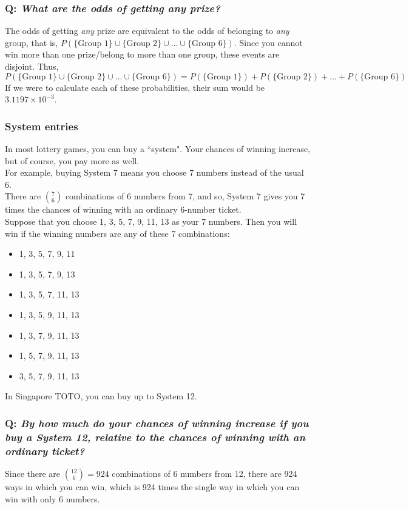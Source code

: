 \documentclass{article}
\begin{document}
\subsubsection*{Q: {\em What are the odds of getting {\em any} prize?}}
The odds of getting \textit{any} prize are equivalent to the odds of belonging to \textit{any} group, that is, $P(\{\text{Group 1}\}\cup\{\text{Group 2}\}\cup\ldots\cup\{\text{Group 6}\})$. Since you cannot win more than one prize/belong to more than one group, these events are disjoint. Thus,
\begin{equation*}
P(\{\text{Group 1}\}\cup\{\text{Group 2}\}\cup\ldots\cup\{\text{Group 6}\})=P(\{\text{Group 1}\})+P(\{\text{Group 2}\})+\ldots+P(\{\text{Group 6}\})
\end{equation*}
If we were to calculate each of these probabilities, their sum would be $3.1197\times 10^{-3}$.

\subsubsection*{System entries}
In most lottery games, you can buy a ``system". Your chances of winning increase, but of course, you pay more as well.\\[1ex] 
For example, buying System 7 means you choose 7 numbers instead of the usual 6.\\
There are $\binom{7}{6}$ combinations of 6 numbers from 7, and so, System 7 gives you 7 times the chances of winning with an ordinary 6-number ticket.\\[1ex]
Suppose that you choose 1, 3, 5, 7, 9, 11, 13 as your 7 numbers. Then you will win if the winning numbers are any of these 7 combinations:
\begin{itemize}
\item 1, 3, 5, 7, 9, 11
\item 1, 3, 5, 7, 9, 13
\item 1, 3, 5, 7, 11, 13
\item 1, 3, 5, 9, 11, 13
\item 1, 3, 7, 9, 11, 13
\item 1, 5, 7, 9, 11, 13
\item 3, 5, 7, 9, 11, 13
\end{itemize}
In Singapore TOTO, you can buy up to System 12.

\subsubsection*{Q: {\em By how much do your chances of winning increase if you buy a System 12, relative to the chances of winning with an ordinary ticket?}}
Since there are $\binom{12}{6}=924$ combinations of 6 numbers from 12, there are 924 ways in which you can win, which is 924 times the single way in which you can win with only 6 numbers.
\end{document}
